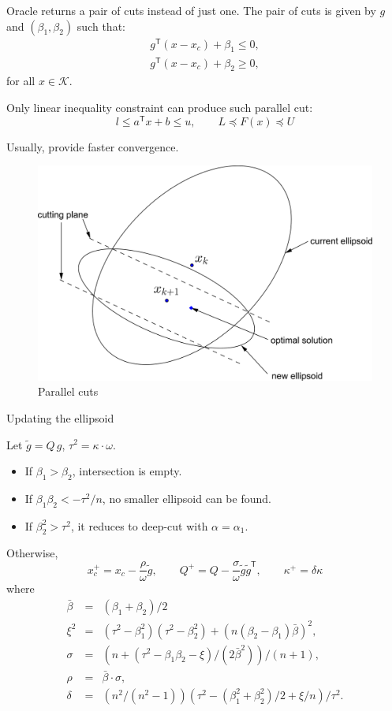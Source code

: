 \documentclass[final,leqno]{siamltex}
\providecommand{\tightlist}{%
  \setlength{\itemsep}{0pt}\setlength{\parskip}{0pt}}
\begin{document}
Oracle returns a pair of cuts instead of just one.
The pair of cuts is given by \(g\) and \((\beta_1, \beta_2)\) such that:
\[\begin{array}{l}
    g^\mathsf{T} (x - x_c) + \beta_1 \leq 0,  \\
    g^\mathsf{T} (x - x_c) + \beta_2 \ge 0,
  \end{array}
\]
for all \(x \in \mathcal{K}\).

Only linear inequality constraint can produce such parallel cut:
\[ l \leq a^\mathsf{T} x + b \leq u, \qquad L \preceq F(x) \preceq U
\]

Usually, provide faster convergence.

\begin{figure}
\hypertarget{fig:parallel_cut}{%
\centering
\includegraphics{ellipsoid.files/parallel_cut.pdf}
\caption{Parallel cuts}\label{fig:parallel_cut}
}
\end{figure}

Updating the ellipsoid

Let \(\tilde{g} = Q\,g\), \(\tau^2 = \kappa\cdot\omega\).

\begin{itemize}
\tightlist
\item
  If \(\beta_1 > \beta_2\), intersection is empty.
\item
  If \(\beta_1 \beta_2 < -\tau^2/n\), no smaller ellipsoid can be found.
\item
  If \(\beta_2^2 > \tau^2\), it reduces to deep-cut with \(\alpha = \alpha_1\).
\end{itemize}

Otherwise,
\[x_c^+ = x_c - \frac{\rho}{\omega} \tilde{g}, \qquad
    Q^+ = Q - \frac{\sigma}{\omega} \tilde{g}\tilde{g}^\mathsf{T}, \qquad
    \kappa^+ =  \delta \kappa
\]
where
\[\begin{array}{lll}
      \bar{\beta} &=& (\beta_1 + \beta_2)/2 \\
      \xi^2 &=& (\tau^2 - \beta_1^2)(\tau^2 - \beta_2^2) + (n(\beta_2 - \beta_1)\bar{\beta})^2, \\
      \sigma &=& (n + (\tau^2 - \beta_1\beta_2 - \xi)/(2\bar{\beta}^2)) / (n + 1), \\
      \rho &=& \bar{\beta}\cdot\sigma, \\
      \delta &=& (n^2/(n^2-1)) (\tau^2 - (\beta_1^2 + \beta_2^2)/2 + \xi/n) / \tau^2 .
\end{array}
\]
\end{document}
